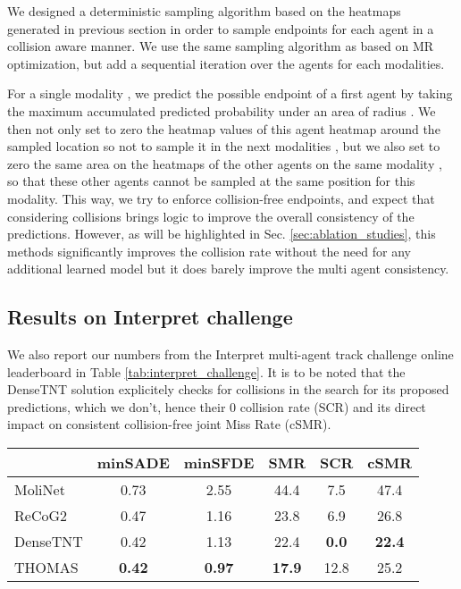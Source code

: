 \documentclass{article} \usepackage{iclr2022_conference,times}
\begin{document}
We designed a deterministic sampling algorithm based on the heatmaps generated in previous section in order to sample endpoints for each agent in a collision aware manner.
We use the same sampling algorithm as \citet{gilles2021gohome} based on MR optimization, but add a sequential iteration over the agents for each modalities. 

For a single modality , we predict the possible endpoint of a first agent  by taking the maximum accumulated predicted probability under an area of radius .
We then not only set to zero the heatmap values of this agent heatmap  around the sampled location so not to sample it in the next modalities , but we also set to zero the same area on the heatmaps   of the other agents  on the same modality , so that these other agents cannot be sampled at the same position for this modality. This way, we try to enforce collision-free endpoints, and expect that considering collisions brings logic to improve the overall consistency of the predictions. However, as will be highlighted in Sec. \ref{sec:ablation_studies}, this methods significantly improves the collision rate without the need for any additional learned model but it does barely improve the multi agent consistency.

\subsection{Results on Interpret challenge}
\label{sec:interpret}

We also report our numbers from the Interpret multi-agent track challenge online leaderboard in Table \ref{tab:interpret_challenge}. It is to be noted that the DenseTNT solution explicitely checks for collisions in the search for its proposed predictions, which we don't, hence their 0 collision rate (SCR) and its direct impact on consistent collision-free joint Miss Rate (cSMR).

\begin{table*}[h]
\caption{Results on Interpret multi-agent regular scene leaderboard (test set)}
    \begin{center}
    \begin{tabular}{l|c c c c c}
      \hline
      & minSADE & minSFDE&SMR& SCR& cSMR \\
      \hline
MoliNet & 0.73 & 2.55 & 44.4 & 7.5 & 47.4 \\
      ReCoG2 \citep{mo2020recog} &  0.47 & 1.16 & 23.8 & 6.9 & 26.8\\
      DenseTNT \citep{gu2021densetnt} & 0.42 & 1.13 & 22.4 & \textbf{0.0} & \textbf{22.4} \\
      \hline
      THOMAS &  \textbf{0.42} & \textbf{0.97} & \textbf{17.9} & 12.8 & 25.2\\

      \hline
    \end{tabular}
    \end{center}
    \label{tab:interpret_challenge}
\end{table*}
\end{document}
